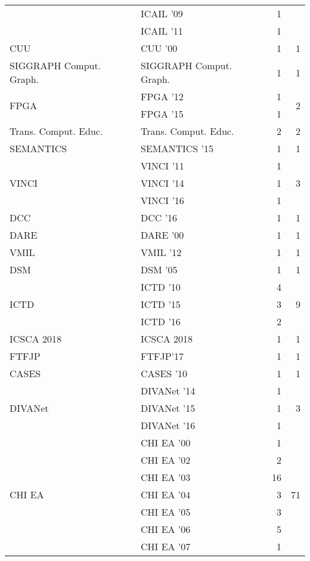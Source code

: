 \begin{table*}[t]
\begin{tabular}{llrr}
& ICAIL '09 & 1 &\\
& ICAIL '11 & 1 &\\
\multirow{1}{*}{CUU } & CUU '00 & 1 & \multirow{1}{*}{1}\\
\multirow{1}{*}{SIGGRAPH Comput. Graph.} & SIGGRAPH Comput. Graph. & 1 & \multirow{1}{*}{1}\\
\multirow{2}{*}{FPGA } & FPGA '12 & 1 & \multirow{2}{*}{2}\\
& FPGA '15 & 1 &\\
\multirow{1}{*}{Trans. Comput. Educ.} & Trans. Comput. Educ. & 2 & \multirow{1}{*}{2}\\
\multirow{1}{*}{SEMANTICS } & SEMANTICS '15 & 1 & \multirow{1}{*}{1}\\
\multirow{3}{*}{VINCI } & VINCI '11 & 1 & \multirow{3}{*}{3}\\
& VINCI '14 & 1 &\\
& VINCI '16 & 1 &\\
\multirow{1}{*}{DCC } & DCC '16 & 1 & \multirow{1}{*}{1}\\
\multirow{1}{*}{DARE } & DARE '00 & 1 & \multirow{1}{*}{1}\\
\multirow{1}{*}{VMIL } & VMIL '12 & 1 & \multirow{1}{*}{1}\\
\multirow{1}{*}{DSM } & DSM '05 & 1 & \multirow{1}{*}{1}\\
\multirow{3}{*}{ICTD } & ICTD '10 & 4 & \multirow{3}{*}{9}\\
& ICTD '15 & 3 &\\
& ICTD '16 & 2 &\\
\multirow{1}{*}{ICSCA 2018} & ICSCA 2018 & 1 & \multirow{1}{*}{1}\\
\multirow{1}{*}{FTFJP} & FTFJP'17 & 1 & \multirow{1}{*}{1}\\
\multirow{1}{*}{CASES } & CASES '10 & 1 & \multirow{1}{*}{1}\\
\multirow{3}{*}{DIVANet } & DIVANet '14 & 1 & \multirow{3}{*}{3}\\
& DIVANet '15 & 1 &\\
& DIVANet '16 & 1 &\\
\multirow{20}{*}{CHI EA } & CHI EA '00 & 1 & \multirow{20}{*}{71}\\
& CHI EA '02 & 2 &\\
& CHI EA '03 & 16 &\\
& CHI EA '04 & 3 &\\
& CHI EA '05 & 3 &\\
& CHI EA '06 & 5 &\\
& CHI EA '07 & 1 &\\

\end{tabular}
\end{table*}
